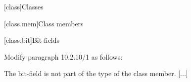 \setcounter{chapter}{9}
[class]{Classes}

\setcounter{section}{1}
[class.mem]{Class members}

\setcounter{subsection}{9}
[class.bit]{Bit-fields}

Modify paragraph 10.2.10/1 as follows:
\begin{std.txt}
    \pnum[1]
    [...] The bit-field  is not part of 
    the type of the class member. [...]
\end{std.txt}
